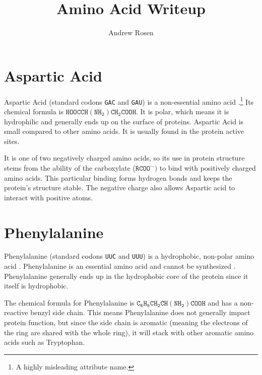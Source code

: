 \documentclass[10pt,letterpaper]{article}
\author{Andrew Rosen}
\title{Amino Acid Writeup}
\begin{document}
\maketitle

\section{Aspartic Acid}
Aspartic Acid (standard codons \texttt{GAC} and \texttt{GAU}) \cite{betts2003amino} is a non-essential amino acid \cite{young1994adult}.\footnote{A highly misleading attribute name.}
Its chemical formula is $\mathtt{ HOOCCH(NH_2)CH_2COOH} $.
It is polar, which means it is hydrophilic \cite{petitjean2007impact} and generally ends up on the surface of proteins.
Aspartic Acid is small compared to other amino acids.
It is usually found in the protein active sites.

It is one of two negatively charged amino acids, so its use in protein structure stems from the ability of the carboxylate ($ \mathtt{RCOO^{-}})$ to bind with positively charged amino acids.
This particular binding forms hydrogen bonds and keeps the protein's structure stable.
The negative charge also allows Aspartic acid to interact with positive atoms.



\section{Phenylalanine}
Phenylalanine  (standard codons \texttt{UUC} and \texttt{UUU}) \cite{betts2003amino} is a hydrophobic, non-polar amino acid \cite{petitjean2007impact}. 
Phenylalanine is an essential amino acid and cannot be synthesized \cite{young1994adult}.
Phenylalanine generally ends up in the hydrophobic core of the protein since it itself is hydrophobic.


The chemical formula for Phenylalanine is $\mathtt{C_{6}H_{5}CH_{2}CH(NH_{2})COOH}$ and has a non-reactive benzyl side chain.
This means Phenylalanine does not generally impact protein function, but since the side chain is aromatic (meaning the electrons of the ring are shared with the whole ring), it will stack with other aromatic amino acids such as Tryptophan.




\end{document}
